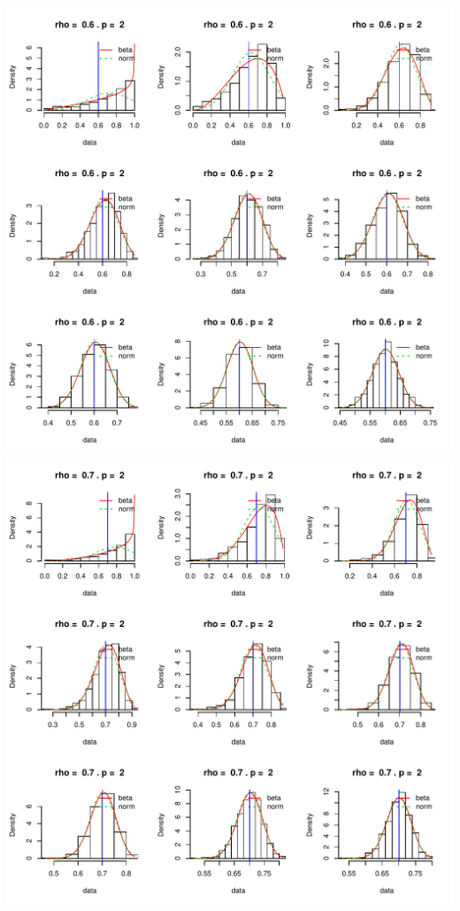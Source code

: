 \documentclass[]{article}
\begin{document}
\includegraphics{2016_w09_files/figure-latex/unnamed-chunk-14-7.pdf}
\includegraphics{2016_w09_files/figure-latex/unnamed-chunk-14-8.pdf}
\end{document}
